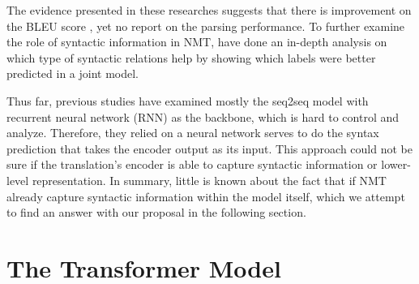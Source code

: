 The evidence presented in these researches  suggests that there is improvement on the BLEU score \cite{BLEU}, yet no report on the parsing performance. To further examine the role of syntactic information in NMT, \citet{DBLP:conf/emnlp/ShiPK16} have done an in-depth analysis on which type of syntactic relations help by showing which labels were better predicted in a joint model.

Thus far, previous studies have examined mostly the seq2seq model with recurrent neural network (RNN) as the backbone, which is hard to control and analyze. Therefore, they relied on a neural network serves to do the syntax prediction that takes the encoder output as its input. This approach could not be sure if the translation's encoder is able to capture syntactic information or lower-level representation. In summary, little is known about the fact that if NMT already capture syntactic information within the model itself, which we attempt to find an answer with our proposal in the following section.

\section{The Transformer Model}

